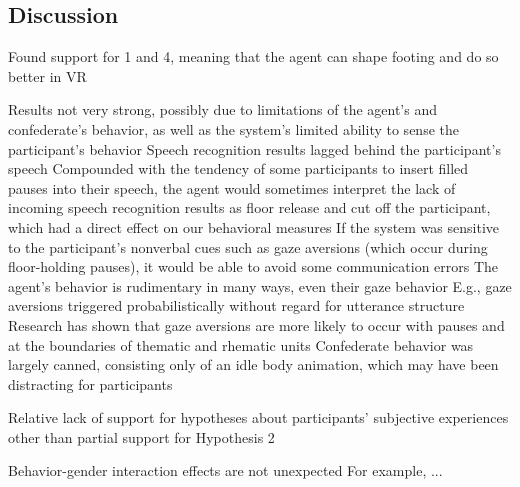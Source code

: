 \subsection{Discussion}

Found support for 1 and 4, meaning that the agent can shape footing and do so better in VR

Results not very strong, possibly due to limitations of the agent's and confederate's behavior, as well as the system's limited ability to sense the participant's behavior
Speech recognition results lagged behind the participant's speech
Compounded with the tendency of some participants to insert filled pauses into their speech, the agent would sometimes interpret the lack of incoming speech recognition results as floor release and cut off the participant, which had a direct effect on our behavioral measures
If the system was sensitive to the participant's nonverbal cues such as gaze aversions (which occur during floor-holding pauses), it would be able to avoid some communication errors
The agent's behavior is rudimentary in many ways, even their gaze behavior
E.g., gaze aversions triggered probabilistically without regard for utterance structure
Research has shown that gaze aversions are more likely to occur with pauses and at the boundaries of thematic and rhematic units
Confederate behavior was largely canned, consisting only of an idle body animation, which may have been distracting for participants

Relative lack of support for hypotheses about participants' subjective experiences
other than partial support for Hypothesis 2

Behavior-gender interaction effects are not unexpected
For example, ...

